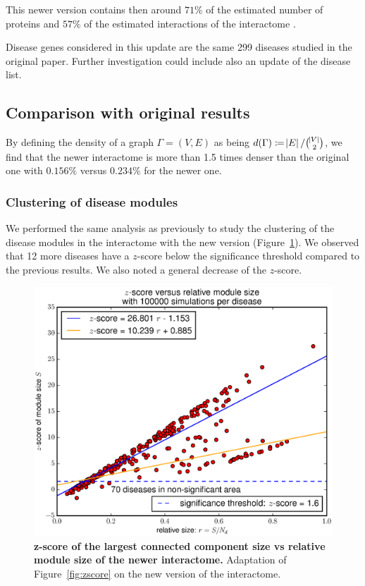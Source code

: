 \documentclass[letterpaper]{article}
\begin{document}
		This newer version contains then around $71\%$ of the estimated number of proteins and $57\%$ of the
		estimated interactions of the interactome \citep{estimatingTheSizeOfTheHumanInteractome,ATruerMeasureOfOurIgnorance}.

		Disease genes considered in this update are the same 299 diseases studied in the original paper.
		Further investigation could include also an update of the disease list.

	\subsection{Comparison with original results}
	By defining the density of a graph $\Gamma = (V, E)$ as being $d(\Gamma) \coloneqq \abs E/\binom {\abs V}2$,
	we find that the newer interactome is more than 1.5 times denser than the original one with $0.156\%$ versus $0.234\%$
	for the newer one.

	\subsubsection{Clustering of disease modules}
	We performed the same analysis as previously to study the clustering of the disease modules in the
	interactome with the new version (Figure~\ref{fig:new interactome zscore}). We observed that 12 more
	diseases have a $z$-score below the significance threshold compared to the previous results. We also
	noted a general decrease of the $z$-score.

	\begin{figure}[h!]
		\centering
		\includegraphics[width=.5\textwidth]{images/new_interactome_S4.b100000.eps}
		\caption{{\bf z-score of the largest connected component size vs relative module size of the newer interactome.}
		Adaptation of Figure~\ref{fig:zscore} on the new version of the interactome.
		\label{fig:new interactome zscore}}
	\end{figure}
\end{document}

